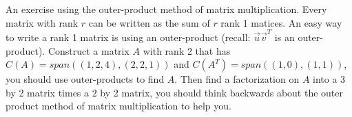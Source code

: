 \documentclass[]{exam}
\begin{document}
\begin{questions}

	\question An exercise using the outer-product method of matrix multiplication. Every matrix with rank $r$ can be written as the sum of $r$ rank 1 matices. An easy way to write a rank 1 matrix is using an outer-product (recall: $\vec{u}\vec{v}^T$ is an outer-product). Construct a matrix $A$ with rank 2 that has $C(A) = span((1,2,4), (2,2,1))$ and $C(A^T) = span((1,0),(1,1))$, you should use outer-products to find $A$. Then find a factorization on $A$ into a 3 by 2 matrix times a 2 by 2 matrix, you should think backwards about the outer product method of matrix multiplication to help you.


\end{questions}
\end{document}
